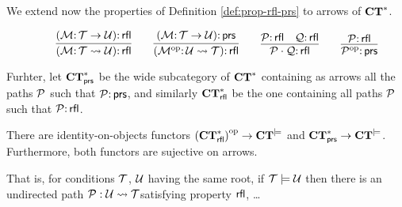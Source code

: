 We extend now the properties of Definition \ref{def:prop-rfl-prs} to arrows of $\mathbf{CT}^*$.

\begin{definition}
    $$
    \qquad \infer{(\cM \of \cT \leadsto \cU)\of \rfl}{(\cM \of \cT \to \cU)\of \rfl} 
    \qquad \infer{(\op{\cM} \of \cU \leadsto \cT)\of \rfl}{(\cM \of \cT \to \cU)\of \prs}
    \qquad \infer{\cP\cdot\cQ\of \rfl}{\cP\of \rfl & \cQ \of \rfl} 
    \qquad \infer{\op{\cP} \of \prs}{\cP\of \rfl} $$

Furhter, let $\mathbf{CT}^*_{{\mathsf{prs}}}$ be the wide subcategory of $\mathbf{CT}^*$ containing as arrows all the paths ${\mathcal{P}}$ such that  ${\mathcal{P}} {:}\, {\mathsf{prs}}$, and similarly $\mathbf{CT}^*_{{\mathsf{rfl}}}$ be the one containing all paths ${\mathcal{P}}$ such that  ${\mathcal{P}} {:}\, {\mathsf{rfl}}$.

\end{definition}

\begin{theorem}
    There are identity-on-objects functors  ${(\mathbf{CT}^*_{{\mathsf{rfl}}})}^{\mathrm{op}} \rightarrow \mathbf{CT}^{\models}$ and $\mathbf{CT}^*_{{\mathsf{prs}}} \rightarrow \mathbf{CT}^{\models}$. Furthermore, both functors are sujective on arrows. 

    That is, for conditions ${\mathcal{T}}$, ${\mathcal{U}}$ having the same root, if ${\mathcal{T}} \models {\mathcal{U}}$ then there is an undirected path ${\mathcal{P}}:{\mathcal{U}} \leadsto {\mathcal{T}} $satisfying property ${\mathsf{rfl}}$, \dots
\end{theorem}



